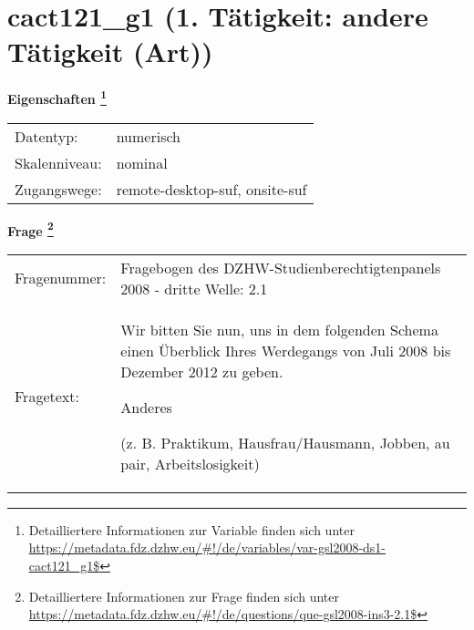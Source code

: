 
    \setcounter{footnote}{0}

    \vspace*{-1.8cm}
	\section{cact121\_g1 (1. Tätigkeit: andere Tätigkeit (Art))}
	\label{section:cact121_g1}



    \vspace*{0.5cm}
    \noindent\textbf{Eigenschaften
	\footnote{Detailliertere Informationen zur Variable finden sich unter
		\url{https://metadata.fdz.dzhw.eu/\#!/de/variables/var-gsl2008-ds1-cact121_g1$}}}\\
	\begin{tabularx}{\hsize}{@{}lX}
	Datentyp: & numerisch \\
	Skalenniveau: & nominal \\
	Zugangswege: &
	  remote-desktop-suf, 
	  onsite-suf
 \\
    \end{tabularx}



				\vspace*{0.5cm}
                \noindent\textbf{Frage
	                \footnote{Detailliertere Informationen zur Frage finden sich unter
		              \url{https://metadata.fdz.dzhw.eu/\#!/de/questions/que-gsl2008-ins3-2.1$}}}\\
				\begin{tabularx}{\hsize}{@{}lX}
					Fragenummer: &
					  Fragebogen des DZHW-Studienberechtigtenpanels 2008 - dritte Welle:
					  2.1
 \\
					Fragetext: & Wir bitten Sie nun, uns in dem folgenden Schema einen Überblick Ihres Werdegangs von Juli 2008 bis Dezember 2012 zu geben.\par  Anderes\par  (z. B. Praktikum, Hausfrau/Hausmann, Jobben, au pair, Arbeitslosigkeit) \\
				\end{tabularx}





